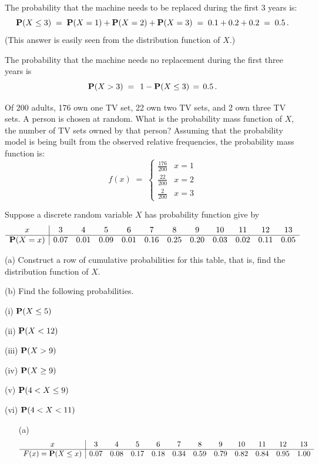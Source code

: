 \begin{ExerciseList}



\item The probability that the machine needs to be replaced during the
  first 3 years is:
$$\mathbf{P}(X \leq  3)\;=\;\mathbf{P}(X=1)+\mathbf{P}(X=2)+\mathbf{P}(X=3)\;=\;0.1+0.2+0.2\;=\;0.5\,.$$
(This answer is easily seen  from the distribution function of $X$.)
\item The probability that the machine needs no replacement during the
first three years is
\[ \mathbf{P}(X >  3)\;=\;\, 1-\mathbf{P}(X \leq  3)\,=\, 0.5 \,.\]
\ee

\Exercise
Of 200 adults, 176 own one TV set, 22 own two TV sets, and 2 own three TV sets.  
A person is chosen at random. What is the probability mass function of $X$,  the number of TV sets owned by that person?
\Answer
Assuming that the probability model is being built from the observed relative frequencies, the probability mass function is:
$$
f(x)\;=\;\begin{cases}\frac{176}{200}&x=1\\\frac{22}{200}&x=2\\\frac{2}{200}&x=3\end{cases}$$

\Exercise
Suppose a discrete random variable $X$ has probability function give by
$$\begin{array}{c|cccccccccccc}
x&3&4&5&6&7&8&9&10&11&12&13\\\hline
 \mathbf{P}(X=x)&0.07&0.01&0.09&0.01&0.16&0.25&0.20&0.03&0.02&0.11&0.05
\end{array}
$$
\be
\item[(a)] Construct a row of cumulative probabilities for this table, that
  is, find the distribution function of $X$.
\item[(b)] Find  the following  probabilities.
\be
\item[(i)]$\mathbf{P}(X\leq 5)$
\item[(ii)] $\mathbf{P}(X<12)$
\item[(iii)] $\mathbf{P}(X>9)$
\item[(iv)] $\mathbf{P}(X\geq 9)$
\item[(v)] $\mathbf{P}(4 <  X\leq 9)$
\item[(vi)] $\mathbf{P}(4<X<11)$
\ee
\ecols
\ee

\Answer
\begin{itemize}
\item[(a)]  $$\begin{array}{c|cccccccccccc}
x&3&4&5&6&7&8&9&10&11&12&13\\\hline
F(x) =\mathbf{P}(X\leq x)&0.07&0.08&0.17&0.18&0.34&0.59&0.79&0.82&0.84&0.95&1.00
\end{array}
$$


\end{itemize}
\end{ExerciseList}
